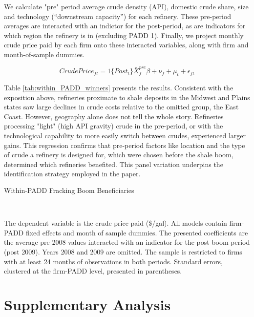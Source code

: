 \documentclass[12pt]{article}
\newcommand{\tablepath}{../output/offline/tables}
\begin{document}
We calculate "pre" period average crude density (API), domestic crude share, size and technology (``downstream capacity'') for each refinery. These pre-period averages are interacted with an indictor for the post-period, as are indicators for which region the refinery is in (excluding PADD 1). Finally, we project monthly crude price paid by each firm onto these interacted variables, along with firm and month-of-sample dummies.

\begin{equation}
  CrudePrice_{ft}= 1\{Post_t\}\bar{X}^{pre}_{f}\beta + \nu_{f} + \mu_t +\epsilon_{ft} \label{eq:boomHeterogeneity}
\end{equation}

Table \ref{tab:within_PADD_winners} presents the results. Consistent with the exposition above, refineries proximate to shale deposits in the Midwest and Plains states saw large declines in crude costs relative to the omitted group, the East Coast. However, geography alone does not tell the whole story. Refineries processing "light" (high API gravity) crude in the pre-period, or with the technological capability to more easily switch between crudes, experienced larger gains. This regression confirms that pre-period factors like location and the type of crude a refinery is designed for, which were chosen before the shale boom, determined which refineries benefited. This panel variation underpins the identification strategy employed in the paper.

\begin{table}[]
  \centering
  \caption{Within-PADD Fracking Boom Beneficiaries \label{tab:within_PADD_winners}}
   \\[1ex]
\begin{minipage}{.6\linewidth}
\scriptsize
  The dependent variable is the crude price paid  (\$/gal). All models contain firm-PADD fixed effects and month of sample dummies. The presented coefficients are the average pre-2008 values interacted with an indicator for the post boom period (post 2009). Years 2008 and 2009 are omitted. The sample is restricted to firms with at least 24 months of observations in both periods. Standard errors, clustered at the firm-PADD level, presented in parentheses.
\end{minipage}
\end{table}

\section{Supplementary Analysis }
\end{document}

